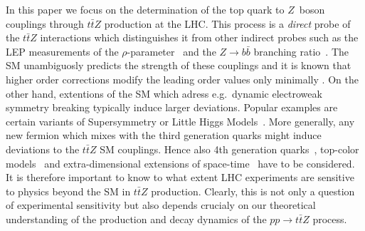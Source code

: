 \documentclass[preprint]{JHEP3}
\def\ttbZ{t\bar{t}Z}
\begin{document}
In this paper we focus on the determination of the top quark to $Z$~boson couplings through $\ttbZ$ production at the LHC. 
This process is a {\it direct} probe of the $\ttbZ$ interactions which distinguishes it from other indirect probes such as 
the LEP measurements of the $\rho$-parameter~\cite{ALEPH:2005ab} and the $Z \to b \bar{b}$ branching ratio~\cite{Abdallah:2008ab}. 
The SM unambiguosly predicts the strength of these couplings and it is known that higher order corrections modify the leading order values only minimally \cite{Hollik:1988ii}.
On the other hand, extentions of the SM which adress e.g.~dynamic electroweak symmetry breaking typically induce larger deviations. 
Popular examples are certain variants of Supersymmetry \cite{PhysRevD.82.055001,PhysRevD.84.015003} or Little Higgs Models~\cite{Schmaltz:2002wx,Cheng:2003ju}.
More generally, any new fermion which mixes with the third generation quarks might induce deviations to the $\ttbZ$ SM couplings. 
Hence also 4th generation quarks~\cite{Frampton:1999xi,Dobrescu:2009vz}, top-color models~\cite{PhysRevD.86.095017} and extra-dimensional extensions of space-time~\cite{Randall:1999ee} 
have to be considered.
% 
% 
It is therefore important to know to what extent LHC experiments are sensitive to physics beyond the SM in $\ttbZ$ production.
Clearly, this is not only a question of experimental sensitivity but also depends crucialy on our theoretical understanding of the production and decay dynamics 
of the $pp\to\ttbZ$ process.
\end{document}
